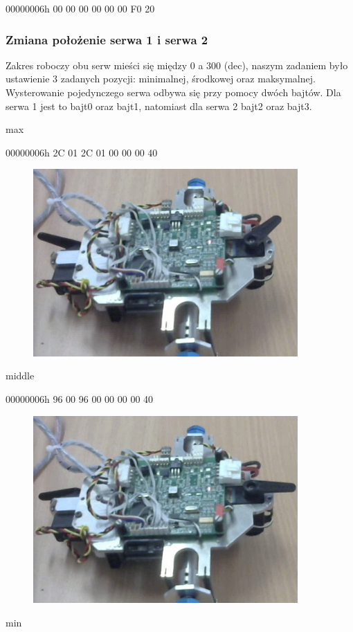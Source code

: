 \documentclass[margin = 2cm]{article}
\begin{document}
	00000006h	00 00 00 00 00 00 F0 20
	\subsubsection{Zmiana położenie serwa 1 i serwa 2}
	Zakres roboczy obu serw mieści się między 0 a 300 (dec), naszym zadaniem było ustawienie 3 zadanych pozycji: minimalnej, środkowej oraz maksymalnej. Wysterowanie pojedynczego serwa odbywa się przy pomocy dwóch bajtów. Dla serwa 1 jest to bajt0 oraz bajt1, natomiast dla    serwa 2  bajt2 oraz bajt3.
	
	max
	
	00000006h	2C 01 2C 01 00 00 00 40
	\begin{figure}[H]
		\centering
		\includegraphics[width=0.9\textwidth]{max}
	\end{figure}
	middle
	
	00000006h	96 00 96 00 00 00 00 40
	\begin{figure}[H]
		\centering
		\includegraphics[width=0.9\textwidth]{middle}
	\end{figure}
	min
	
\end{document}
